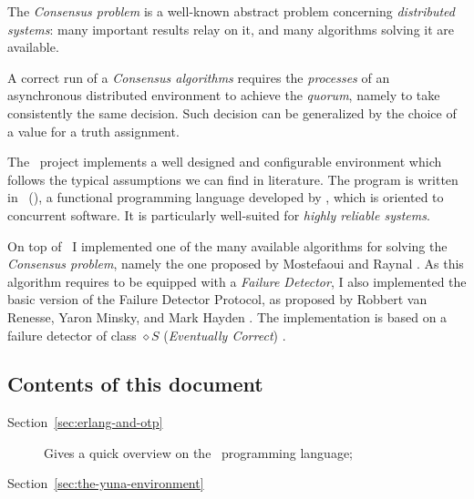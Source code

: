 The \emph{Consensus problem} is a well-known abstract problem concerning
\emph{distributed systems}: many important results relay on it, and many
algorithms solving it are available.

A correct run of a \emph{Consensus algorithms} requires the
\emph{processes} of an asynchronous distributed environment to achieve the
\emph{quorum}, namely to take consistently the same decision. Such
decision can be generalized by the choice of a value for a truth
assignment.

The \YUNA\ project implements a well designed and configurable environment
which follows the typical assumptions we can find in literature. The
program is written in \Erlang\ (), a functional
programming language developed by , which is oriented to
concurrent software. It is particularly well-suited for \emph{highly
reliable systems}.

On top of \YUNA\ I implemented one of the many available algorithms for
solving the \emph{Consensus problem}, namely the one proposed by Mostefaoui and
Raynal \cite{bib:Cons}. As this algorithm requires to be equipped with a
\emph{Failure Detector}, I also implemented the basic version of the
Failure Detector Protocol, as proposed by Robbert van Renesse, Yaron
Minsky, and Mark Hayden \cite{bib:FD}. The implementation is based on a
failure detector of class $\diamond S$ (\emph{Eventually Correct})
\cite{bib:QualityFD}.

\subsection{Contents of this document}

\begin{description}

    \item[Section~\ref{sec:erlang-and-otp}] Gives a quick overview on the
        \Erlang\ programming language;

    \item[Section~\ref{sec:the-yuna-environment}]

\end{description}
